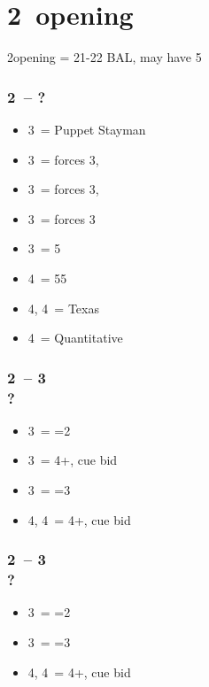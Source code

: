 \section{\texorpdfstring{2\ntx\ opening}{2ntOpening}}\label{sec:2ntOpening}

2\nt\alrts opening = 21-22 BAL, may have 5\majs

\subsubsection*{2\ntx\ -- ?}
\begin{itemize}
    \item 3\clubs\ = Puppet Stayman
    \item 3\diams\ = forces 3\hearts, \gf
    \item 3\hearts\ = forces 3\spades, \gf
    \item 3\spades\ = forces 3\nt
    \item 3\nt\ = 5\hearts
    \item 4\clubs\ = 55 \majs
    \item 4\diams, 4\hearts\ = Texas
    \item 4\nt\ = Quantitative
\end{itemize}

\subsubsection*{2\ntx\ -- 3\diams \\ ?}
\begin{itemize}
    \item 3\hearts\ = =2\hearts
    \item 3\spades\ = 4+\hearts, cue bid
    \item 3\nt\ = =3\spades
    \item 4\clubs, 4\diams\ = 4+\hearts, cue bid
\end{itemize}

\subsubsection*{2\ntx\ -- 3\hearts \\ ?}
\begin{itemize}
    \item 3\spades\ = =2\spades
    \item 3\nt\ = =3\spades
    \item 4\clubs, 4\diams\ = 4+\spades, cue bid
\end{itemize}

